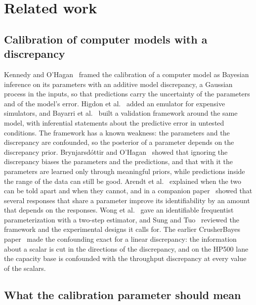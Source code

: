 \section{Related work}\label{sec:related}

\subsection{Calibration of computer models with a discrepancy}

Kennedy and O'Hagan~\cite{ko} framed the calibration of a computer model as Bayesian inference on its parameters with an
additive model discrepancy, a Gaussian process in the inputs, so that predictions carry the uncertainty of the parameters and
of the model's error. Higdon et al.~\cite{higdon} added an emulator for expensive simulators, and Bayarri et al.~\cite{bayarri}
built a validation framework around the same model, with inferential statements about the predictive error in untested
conditions. The framework has a known weakness: the parameters and the discrepancy are confounded, so the posterior of a
parameter depends on the discrepancy prior. Brynjarsd\'ottir and O'Hagan~\cite{brynj} showed that ignoring the discrepancy
biases the parameters and the predictions, and that with it the parameters are learned only through meaningful priors, while
predictions inside the range of the data can still be good. Arendt et al.~\cite{arendt} explained when the two can be told
apart and when they cannot, and in a companion paper~\cite{arendt2} showed that several responses that share a parameter
improve its identifiability by an amount that depends on the responses. Wong et al.~\cite{wong} gave an identifiable
frequentist parameterization with a two-step estimator, and Sung and Tuo~\cite{sungtuo} reviewed the framework and the
experimental designs it calls for. The earlier CrusherBayes paper~\cite{cb002} made the confounding exact for a linear
discrepancy: the information about a scalar is cut in the directions of the discrepancy, and on the HP500 lane the capacity
base is confounded with the throughput discrepancy at every value of the scalars.

\subsection{What the calibration parameter should mean}

